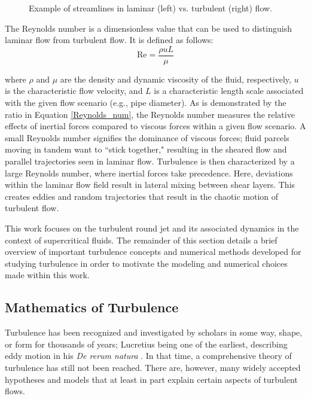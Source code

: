 \begin{figure}[h!]
\begin{center}
\end{center}
\caption{Example of streamlines in laminar (left) vs. turbulent (right) flow.}
\label{lam_vs_turb}
\end{figure}

The Reynolds number is a dimensionless value that can be used to distinguish laminar flow from turbulent flow. It is defined as follows:
\begin{equation}
\label{Reynolds_num}
\text{Re} = \frac{\rho u L}{\mu}
\end{equation}

\noindent where $\rho$ and $\mu$ are the density and dynamic viscosity of the fluid, respectively, $u$ is the characteristic flow velocity, and $L$ is a characteristic length scale associated with the given flow scenario (e.g., pipe diameter). As is demonstrated by the ratio in Equation \eqref{Reynolds_num}, the Reynolds number measures the relative effects of inertial forces compared to viscous forces within a given flow scenario. A small Reynolds number signifies the dominance of viscous forces; fluid parcels moving in tandem want to ``stick together," resulting in the sheared flow and parallel trajectories seen in laminar flow. Turbulence is then characterized by a large Reynolds number, where inertial forces take precedence. Here, deviations within the laminar flow field result in lateral mixing between shear layers. This creates eddies and random trajectories that result in the chaotic motion of turbulent flow. 

This work focuses on the turbulent round jet and its associated dynamics in the context of supercritical fluids. The remainder of this section details a brief overview of important turbulence concepts and numerical methods developed for studying turbulence in order to motivate the modeling and numerical choices made within this work.

\subsection{Mathematics of Turbulence}
Turbulence has been recognized and investigated by scholars in some way, shape, or form for thousands of years; Lucretius being one of the earliest, describing eddy motion in his \textit{De rerum natura} \cite{Benzi:2010}. In that time, a comprehensive theory of turbulence has still not been reached. There are, however, many widely accepted hypotheses and models that at least in part explain certain aspects of turbulent flows.  

